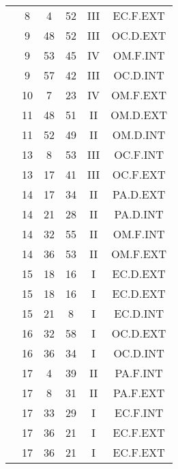 \documentclass[12pt, a4paper]{article}
\begin{document}
\begin{multicols}{3}
{\begin{tabular}{c c c c c c}
	 	 	 	 & 8 & 4 & 52 & III & EC.F.EXT\\%
	 	 	 	 & 9 & 48 & 52 & III & OC.D.EXT\\%
	 	 	 	 & 9 & 53 & 45 & IV & OM.F.INT\\%
	 	 	 	 & 9 & 57 & 42 & III & OC.D.INT\\%
	 	 	 	 & 10 & 7 & 23 & IV & OM.F.EXT\\%
	 	 	 	 & 11 & 48 & 51 & II & OM.D.EXT\\%
	 	 	 	 & 11 & 52 & 49 & II & OM.D.INT\\%
	 	 	 	 & 13 & 8 & 53 & III & OC.F.INT\\%
	 	 	 	 & 13 & 17 & 41 & III & OC.F.EXT\\%
	 	 	 	 & 14 & 17 & 34 & II & PA.D.EXT\\%
	 	 	 	 & 14 & 21 & 28 & II & PA.D.INT\\%
	 	 	 	 & 14 & 32 & 55 & II & OM.F.INT\\%
	 	 	 	 & 14 & 36 & 53 & II & OM.F.EXT\\%
	 	 	 	 & 15 & 18 & 16 & I & EC.D.EXT\\%
	 	 	 	 & 15 & 18 & 16 & I & EC.D.EXT\\%
	 	 	 	 & 15 & 21 & 8 & I & EC.D.INT\\%
	 	 	 	 & 16 & 32 & 58 & I & OC.D.EXT\\%
	 	 	 	 & 16 & 36 & 34 & I & OC.D.INT\\%
	 	 	 	 & 17 & 4 & 39 & II & PA.F.INT\\%
	 	 	 	 & 17 & 8 & 31 & II & PA.F.EXT\\%
	 	 	 	 & 17 & 33 & 29 & I & EC.F.INT\\%
	 	 	 	 & 17 & 36 & 21 & I & EC.F.EXT\\%
	 	 	 	 & 17 & 36 & 21 & I & EC.F.EXT\\%

\end{tabular}}
\end{multicols}
\end{document}
